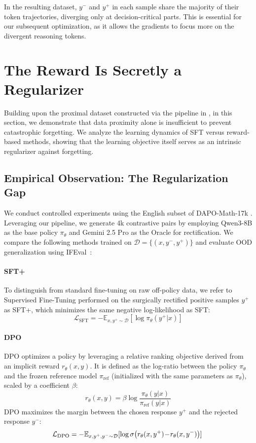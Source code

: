 \documentclass{article}
\theoremstyle{plain}
\theoremstyle{definition}
\theoremstyle{remark}
\begin{document}
In the resulting dataset, $y^-$ and $y^+$ in each sample share the majority of their token trajectories, diverging only at decision-critical parts. This is essential for our subsequent optimization, as it allows the gradients to focus more on the divergent reasoning tokens.

\section{The Reward Is Secretly a Regularizer}
\label{sec:reward}
Building upon the proximal dataset constructed via the pipeline in , in this section, we demonstrate that data proximity alone is insufficient to prevent catastrophic forgetting. We analyze the learning dynamics of SFT versus reward-based methods, showing that the learning objective itself serves as an intrinsic regularizer against forgetting.
\subsection{Empirical Observation: The Regularization Gap}
We conduct controlled experiments using the English subset of DAPO-Math-17k \cite{yu2025dapo}. Leveraging our pipeline, we generate 4k contrastive pairs by employing Qwen3-8B as the base policy $\pi_\theta$ and Gemini 2.5 Pro as the Oracle for rectification.
We compare the following methods trained on $\mathcal{D} = \{(x, y^-, y^+)\}$ and evaluate OOD generalization using IFEval~\citep{zhou2023instruction}:
\paragraph{SFT+} To distinguish from standard fine-tuning on raw off-policy data, we refer to Supervised Fine-Tuning performed on the surgically rectified positive samples $y^+$ as SFT+, which minimizes the same negative log-likelihood as SFT:
\begin{equation}
    \mathcal{L}_{\text{SFT}} = - \mathbb{E}_{x, y^+ \sim \mathcal{D}} [\log \pi_\theta(y^+|x)]
\end{equation}

\paragraph{DPO}
DPO optimizes a policy by leveraging a relative ranking objective derived from an implicit reward $r_\theta(x, y)$. It is defined as the log-ratio between the policy $\pi_\theta$ and the frozen reference model $\pi_{\text{ref}}$ (initialized with the same parameters as $\pi_\theta$), scaled by a coefficient $\beta$:
\begin{equation}
    r_\theta(x, y) = \beta \log \frac{\pi_\theta(y|x)}{\pi_{\text{ref}}(y|x)} \label{eq:reward_def}
\end{equation}
DPO maximizes the margin between the chosen response $y^+$ and the rejected response $y^-$:
\begin{equation}
\hspace{-3pt}
    \mathcal{L}_{\text{DPO}} = - \mathbb{E}_{x, y^+, y^- \sim \mathcal{D}} [\log \sigma \! \left( r_\theta(x, y^+) \!-\! r_\theta(x, y^-) \right)] \label{eq:dpo_loss}
\end{equation}
\end{document}
